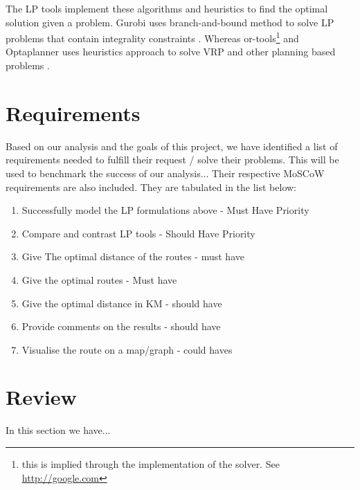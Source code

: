 The LP tools implement these algorithms and heuristics to find the optimal solution given a problem. Gurobi uses branch-and-bound method
to solve LP problems that contain integrality constraints \cite{gurobi:mip}. Whereas or-tools\footnote{this
is implied through the implementation of the solver. See \url{http://google.com}} and Optaplanner uses heuristics approach to solve VRP and other planning based
problems \cite{Optaplanner}.


\section{Requirements}
Based on our analysis and the goals of this project, we have identified a list of requirements needed to fulfill
their request / solve their problems. This will be used to benchmark the success of our analysis... Their respective
MoSCoW requirements are also included. They are tabulated in the list below:
\begin{enumerate}
\item Successfully model the LP formulations above - Must Have Priority
\item Compare and contrast LP tools - Should Have Priority
\item Give The optimal distance of the routes - must have
\item Give the optimal routes  - Must have
\item Give the optimal distance in KM - should have
\item Provide comments on the results - should have
\item Visualise the route on a map/graph - could haves
\end{enumerate}

\section{Review}
In this section we have...